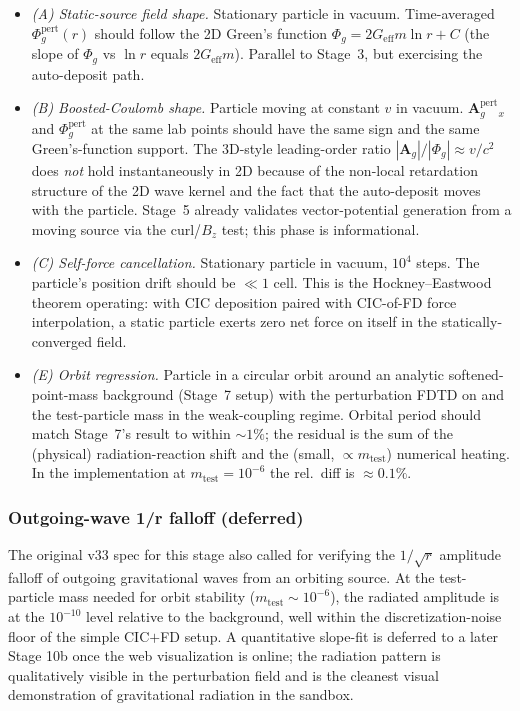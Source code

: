 \documentclass[11pt,a4paper]{article}
\newcommand{\vv}[1]{\mathbf{#1}}
\newcommand{\Phig}{\Phi_g}
\newcommand{\Ag}{\vv{A}_g}
\begin{document}
\begin{itemize}
  \item \emph{(A) Static-source field shape.}  Stationary particle in
        vacuum.  Time-averaged $\Phig^{\mathrm{pert}}(r)$ should follow
        the 2D Green's function $\Phig = 2 G_{\mathrm{eff}} m \ln r + C$
        (the slope of $\Phig$ vs $\ln r$ equals $2 G_{\mathrm{eff}} m$).
        Parallel to Stage~3, but exercising the auto-deposit path.
  \item \emph{(B) Boosted-Coulomb shape.}  Particle moving at constant
        $v$ in vacuum.  $\Ag^{\mathrm{pert}}_x$ and
        $\Phig^{\mathrm{pert}}$ at the same lab points should have the
        same sign and the same Green's-function support.  The 3D-style
        leading-order ratio $|\Ag|/|\Phig| \approx v/c^2$ does
        \emph{not} hold instantaneously in 2D because of the non-local
        retardation structure of the 2D wave kernel and the fact that
        the auto-deposit moves with the particle.  Stage~5 already
        validates vector-potential generation from a moving source via
        the curl/$B_z$ test; this phase is informational.
  \item \emph{(C) Self-force cancellation.}  Stationary particle in
        vacuum, $10^4$ steps.  The particle's position drift should be
        $\ll 1$ cell.  This is the Hockney--Eastwood theorem operating:
        with CIC deposition paired with CIC-of-FD force interpolation,
        a static particle exerts zero net force on itself in the
        statically-converged field.
  \item \emph{(E) Orbit regression.}  Particle in a circular orbit
        around an analytic softened-point-mass background (Stage~7
        setup) with the perturbation FDTD on and the test-particle
        mass in the weak-coupling regime.  Orbital period should match
        Stage~7's result to within $\sim 1\%$; the residual is the
        sum of the (physical) radiation-reaction shift and the (small,
        $\propto m_{\mathrm{test}}$) numerical heating.  In the
        implementation at $m_{\mathrm{test}} = 10^{-6}$ the rel.\ diff
        is $\approx 0.1\%$.
\end{itemize}

\subsubsection*{Outgoing-wave 1/\textsurd{}r falloff (deferred)}

The original v33 spec for this stage also called for verifying the
$1/\sqrt{r}$ amplitude falloff of outgoing gravitational waves from an
orbiting source.  At the test-particle mass needed for orbit stability
($m_{\mathrm{test}} \sim 10^{-6}$), the radiated amplitude is at the
$10^{-10}$ level relative to the background, well within the
discretization-noise floor of the simple CIC$+$FD setup.  A
quantitative slope-fit is deferred to a later Stage 10b once the web
visualization is online; the radiation pattern is qualitatively visible
in the perturbation field and is the cleanest visual demonstration of
gravitational radiation in the sandbox.
\end{document}
